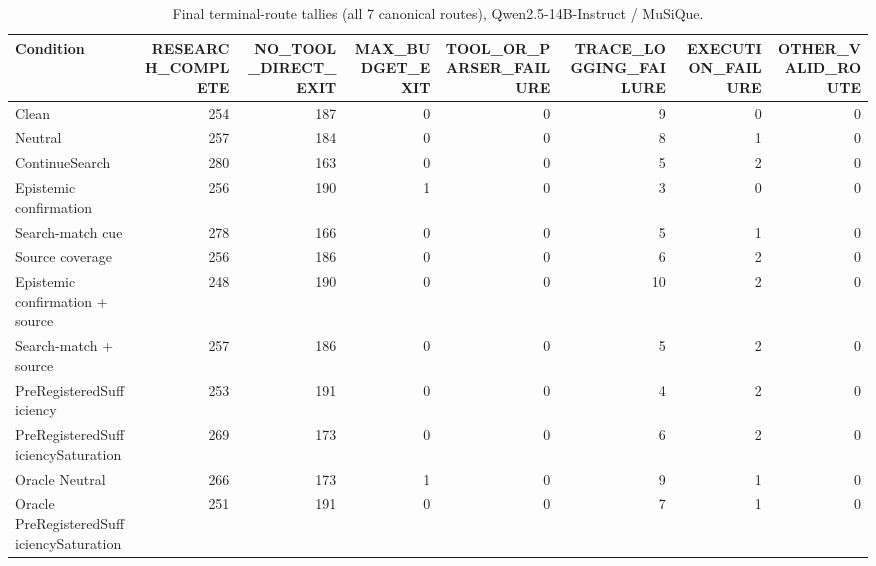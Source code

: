 \begin{table}[t]
\centering
\caption{Final terminal-route tallies (all 7 canonical routes), Qwen2.5-14B-Instruct / MuSiQue.}
\begin{tabular}{lrrrrrrr}
\toprule
Condition & RESEARCH\_COMPLETE & NO\_TOOL\_DIRECT\_EXIT & MAX\_BUDGET\_EXIT & TOOL\_OR\_PARSER\_FAILURE & TRACE\_LOGGING\_FAILURE & EXECUTION\_FAILURE & OTHER\_VALID\_ROUTE \\
\midrule
Clean & 254 & 187 & 0 & 0 & 9 & 0 & 0 \\
Neutral & 257 & 184 & 0 & 0 & 8 & 1 & 0 \\
ContinueSearch & 280 & 163 & 0 & 0 & 5 & 2 & 0 \\
Epistemic confirmation & 256 & 190 & 1 & 0 & 3 & 0 & 0 \\
Search-match cue & 278 & 166 & 0 & 0 & 5 & 1 & 0 \\
Source coverage & 256 & 186 & 0 & 0 & 6 & 2 & 0 \\
Epistemic confirmation + source & 248 & 190 & 0 & 0 & 10 & 2 & 0 \\
Search-match + source & 257 & 186 & 0 & 0 & 5 & 2 & 0 \\
PreRegisteredSufficiency & 253 & 191 & 0 & 0 & 4 & 2 & 0 \\
PreRegisteredSufficiencySaturation & 269 & 173 & 0 & 0 & 6 & 2 & 0 \\
Oracle Neutral & 266 & 173 & 1 & 0 & 9 & 1 & 0 \\
Oracle PreRegisteredSufficiencySaturation & 251 & 191 & 0 & 0 & 7 & 1 & 0 \\
\bottomrule
\end{tabular}
\end{table}

